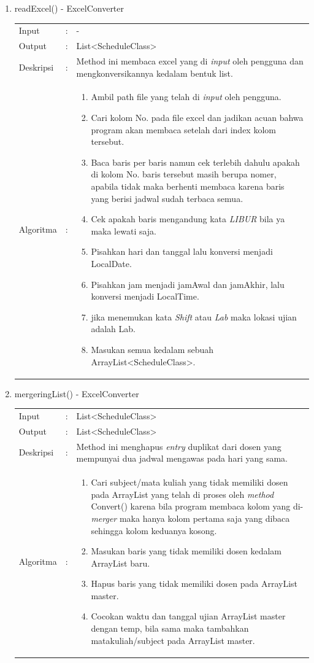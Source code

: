 \begin{enumerate}
	\item readExcel() - ExcelConverter\\
	\begin{tabular}{l c p{9cm}}
		Input & : & - \\ 
		Output & : & List<ScheduleClass>  \\ 
		Deskripsi & : & Method ini membaca excel yang di \textit{input} oleh pengguna dan mengkonversikannya kedalam bentuk list.\\
		Algoritma & : & \begin{enumerate}
			\item Ambil path file yang telah di \textit{input} oleh pengguna.
			\item Cari kolom No. pada file excel dan jadikan acuan bahwa program akan membaca setelah dari index kolom tersebut.
			\item Baca baris per baris namun cek terlebih dahulu apakah di kolom No. baris tersebut masih berupa nomer, apabila tidak maka berhenti membaca karena baris yang berisi jadwal sudah terbaca semua.
			\item Cek apakah baris mengandung kata \textit{LIBUR} bila ya maka lewati saja.
			\item Pisahkan hari dan tanggal lalu konversi menjadi LocalDate. 
			\item Pisahkan jam menjadi jamAwal dan jamAkhir, lalu konversi menjadi LocalTime.
			\item jika menemukan kata \textit{Shift} atau \textit{Lab} maka lokasi ujian adalah Lab.
			\item Masukan semua kedalam sebuah ArrayList<ScheduleClass>.
		\end{enumerate}
		\end{tabular}	
	
	\item mergeringList() - ExcelConverter\\
	\begin{tabular}{l c p{9cm}}
		Input & : & List<ScheduleClass> \\ 
		Output & : & List<ScheduleClass> \\ 
		Deskripsi & : & Method ini menghapus \textit{entry} duplikat dari dosen yang mempunyai dua jadwal mengawas pada hari yang sama.\\
		Algoritma & : & 
			\begin{enumerate}
				\item Cari subject/mata kuliah yang tidak memiliki dosen pada ArrayList yang telah di proses oleh \textit{method} Convert() karena bila program membaca kolom yang di-\textit{merger} maka hanya kolom pertama saja yang dibaca sehingga kolom keduanya kosong.
				\item Masukan baris yang tidak memiliki dosen kedalam ArrayList baru.
				\item Hapus baris yang tidak memiliki dosen pada ArrayList master.
				\item Cocokan waktu dan tanggal ujian ArrayList master dengan temp, bila sama maka tambahkan matakuliah/subject pada ArrayList master.
			\end{enumerate}
		\end{tabular}	
	

\end{enumerate}
